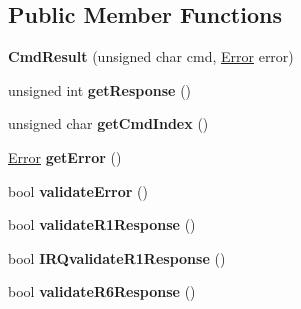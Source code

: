 \subsection*{Public Member Functions}
\begin{DoxyCompactItemize}
\item 
\hypertarget{classmiosix_1_1_cmd_result_a7ce0eec715fa5965a5d908d1d8798e3a}{{\bfseries Cmd\-Result} (unsigned char cmd, \hyperlink{classmiosix_1_1_cmd_result_a5f41145bee0231a6b1b1db62db692b39}{Error} error)}\label{classmiosix_1_1_cmd_result_a7ce0eec715fa5965a5d908d1d8798e3a}

\item 
\hypertarget{classmiosix_1_1_cmd_result_a7763cb51ab4f34e252355d8f7b77abea}{unsigned int {\bfseries get\-Response} ()}\label{classmiosix_1_1_cmd_result_a7763cb51ab4f34e252355d8f7b77abea}

\item 
\hypertarget{classmiosix_1_1_cmd_result_af6761ca53d02cad0d87329a141bbaaff}{unsigned char {\bfseries get\-Cmd\-Index} ()}\label{classmiosix_1_1_cmd_result_af6761ca53d02cad0d87329a141bbaaff}

\item 
\hypertarget{classmiosix_1_1_cmd_result_a7654324ecb24805e5daa2b5635b0e046}{\hyperlink{classmiosix_1_1_cmd_result_a5f41145bee0231a6b1b1db62db692b39}{Error} {\bfseries get\-Error} ()}\label{classmiosix_1_1_cmd_result_a7654324ecb24805e5daa2b5635b0e046}

\item 
\hypertarget{classmiosix_1_1_cmd_result_af0543b1d2d5bec6aaf48cdd7de18b291}{bool {\bfseries validate\-Error} ()}\label{classmiosix_1_1_cmd_result_af0543b1d2d5bec6aaf48cdd7de18b291}

\item 
\hypertarget{classmiosix_1_1_cmd_result_a841e6be6e4c589712df6c573adf22e4d}{bool {\bfseries validate\-R1\-Response} ()}\label{classmiosix_1_1_cmd_result_a841e6be6e4c589712df6c573adf22e4d}

\item 
\hypertarget{classmiosix_1_1_cmd_result_a703b4fcba27158e55567c2212599ed5e}{bool {\bfseries I\-R\-Qvalidate\-R1\-Response} ()}\label{classmiosix_1_1_cmd_result_a703b4fcba27158e55567c2212599ed5e}

\item 
\hypertarget{classmiosix_1_1_cmd_result_a664c897b9787b8d02310e78283e1fdef}{bool {\bfseries validate\-R6\-Response} ()}\label{classmiosix_1_1_cmd_result_a664c897b9787b8d02310e78283e1fdef}


\end{DoxyCompactItemize}
